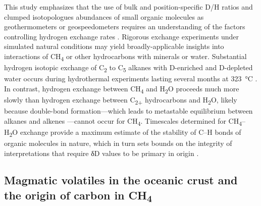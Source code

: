 This study emphasizes that the use of bulk and position-specific D/H
ratios and clumped isotopologues abundances of small organic molecules
as geothermometers or geospeedometers requires an understanding of the
factors controlling hydrogen exchange rates \parencite{Eiler_2013_AREarth}. Rigorous
exchange experiments under simulated natural conditions may yield
broadly-applicable insights into interactions of CH\textsubscript{4} or
other hydrocarbons with minerals or water. Substantial hydrogen isotopic
exchange of C\textsubscript{2} to C\textsubscript{5­} alkanes with
D-enriched and D-depleted water occurs during hydrothermal experiments
lasting several months at 323~°C \parencite{Reeves++_2012_GCA}. In contrast,
hydrogen exchange between CH\textsubscript{4} and H\textsubscript{2}O
proceeds much more slowly than hydrogen exchange between
C\textsubscript{2+} hydrocarbons and H\textsubscript{2}O, likely because
double-bond formation---which leads to metastable equilibrium between
alkanes and alkenes \parencite{Seewald_1994_N}---cannot occur for
CH\textsubscript{4}. Timescales determined for
CH\textsubscript{4}--H\textsubscript{2}O exchange provide a maximum
estimate of the stability of C--H bonds of organic molecules in nature,
which in turn sets bounds on the integrity of interpretations that
require δD values to be primary in origin \parencite{Sessions++_2004_GCA,Schimmelmann++_2006_AREarth}.

\subsection{\texorpdfstring{Magmatic volatiles in the oceanic crust
		and the origin of carbon in CH\textsubscript{4}
	}{Magmatic volatiles in the oceanic crust and the origin of carbon in CH4 }}\label{magmatic-volatiles-in-the-oceanic-crust-and-the-origin-of-carbon-in-ch4}

